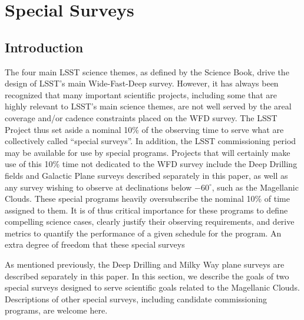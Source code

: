 \chapter[Special Surveys]{Special Surveys}
\def\chpname{specialsurveys}\label{chp:\chpname}





\section{Introduction}
\label{sec:specials:intro}


The four main LSST science themes, as defined by the Science Book, drive the design of LSST's main Wide-Fast-Deep survey.  However, it has always been recognized that many important scientific projects, including some that are highly relevant to LSST's main science themes, are not well served by the areal coverage and/or cadence constraints placed on the WFD survey.  The LSST Project thus set aside a nominal 10\% of the observing time to serve what are collectively called ``special surveys''.  In addition, the LSST commissioning period may be available for use by special programs.  Projects that will certainly make use of this 10\% time not dedicated to the WFD survey include the Deep Drilling fields and Galactic Plane surveys described separately in this paper, as well as any survey wishing to observe at declinations below $-60^\circ$, such as the Magellanic Clouds.  These special programs heavily oversubscribe the nominal 10\% of time assigned to them.  It is of thus critical importance for these programs to define compelling science cases, clearly justify their observing requirements, and derive metrics to quantify the performance of a given schedule for the program.  An extra degree of freedom that these special surveys 


As mentioned previously, the Deep Drilling and Milky Way plane surveys are described separately in this paper.  In this section, we describe the goals of two special surveys designed to serve scientific goals related to the Magellanic Clouds.  Descriptions of other special surveys, including candidate commissioning programs, are welcome here.






% 


\navigationbar
